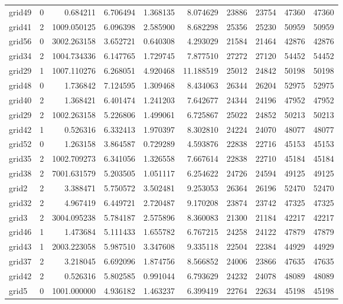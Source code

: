 \begin{longtable}{|l|r|r|r|r|r|r|r|r|r|}
grid49 & 0 & 0.684211 & 6.706494 & 1.368135 & 8.074629 & 23886 & 23754 & 47360 & 47360 \\
grid41 & 2 & 1009.050125 & 6.096398 & 2.585900 & 8.682298 & 25356 & 25230 & 50959 & 50959 \\
grid56 & 0 & 3002.263158 & 3.652721 & 0.640308 & 4.293029 & 21584 & 21464 & 42876 & 42876 \\
grid34 & 2 & 1004.734336 & 6.147765 & 1.729745 & 7.877510 & 27272 & 27120 & 54452 & 54452 \\
grid29 & 1 & 1007.110276 & 6.268051 & 4.920468 & 11.188519 & 25012 & 24842 & 50198 & 50198 \\
grid48 & 0 & 1.736842 & 7.124595 & 1.309468 & 8.434063 & 26344 & 26204 & 52975 & 52975 \\
grid40 & 2 & 1.368421 & 6.401474 & 1.241203 & 7.642677 & 24344 & 24196 & 47952 & 47952 \\
grid29 & 2 & 1002.263158 & 5.226806 & 1.499061 & 6.725867 & 25022 & 24852 & 50213 & 50213 \\
grid42 & 1 & 0.526316 & 6.332413 & 1.970397 & 8.302810 & 24224 & 24070 & 48077 & 48077 \\
grid52 & 0 & 1.263158 & 3.864587 & 0.729289 & 4.593876 & 22838 & 22716 & 45153 & 45153 \\
grid35 & 2 & 1002.709273 & 6.341056 & 1.326558 & 7.667614 & 22838 & 22710 & 45184 & 45184 \\
grid38 & 2 & 7001.631579 & 5.203505 & 1.051117 & 6.254622 & 24726 & 24594 & 49125 & 49125 \\
grid2 & 2 & 3.388471 & 5.750572 & 3.502481 & 9.253053 & 26364 & 26196 & 52470 & 52470 \\
grid32 & 2 & 4.967419 & 6.449721 & 2.720487 & 9.170208 & 23874 & 23742 & 47325 & 47325 \\
grid3 & 2 & 3004.095238 & 5.784187 & 2.575896 & 8.360083 & 21300 & 21184 & 42217 & 42217 \\
grid46 & 1 & 1.473684 & 5.111433 & 1.655782 & 6.767215 & 24258 & 24122 & 47879 & 47879 \\
grid43 & 1 & 2003.223058 & 5.987510 & 3.347608 & 9.335118 & 22504 & 22384 & 44929 & 44929 \\
grid37 & 2 & 3.218045 & 6.692096 & 1.874756 & 8.566852 & 24006 & 23866 & 47635 & 47635 \\
grid42 & 2 & 0.526316 & 5.802585 & 0.991044 & 6.793629 & 24232 & 24078 & 48089 & 48089 \\
grid5 & 0 & 1001.000000 & 4.936182 & 1.463237 & 6.399419 & 22764 & 22634 & 45198 & 45198 \\

\end{longtable}
